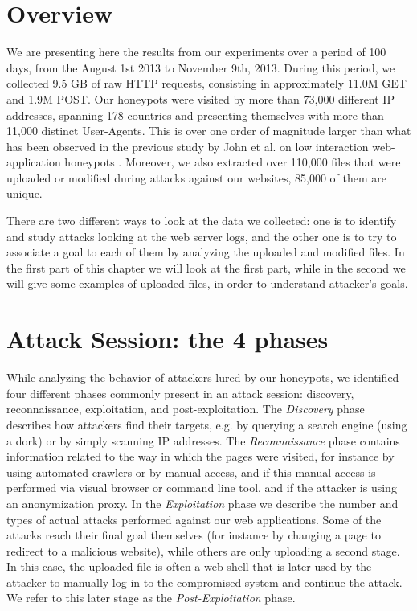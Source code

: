 \section{Overview}

We are presenting here the results from our experiments over a period of 100 days, from the August 1st 2013 to November 9th, 2013. During this period, we collected 9.5 GB of raw HTTP requests, consisting in approximately 11.0M GET and 1.9M POST. Our honeypots were visited by more than 73,000 different IP addresses, spanning 178 countries and presenting themselves with more than 11,000 distinct User-Agents. This is over one order of magnitude larger than what has been observed in the previous study by John et al. on low interaction web-application honeypots \cite{johnhsh}. Moreover, we also extracted over 110,000 files that were uploaded or modified during attacks against our websites, 85,000 of them are unique.

There are two different ways to look at the data we collected: one is to identify and study attacks looking at the web server logs, and the other one is to try to associate a goal to each of them by analyzing the uploaded and modified files. In the first part of this chapter we will look at the first part, while in the second we will give some examples of uploaded files, in order to understand attacker's goals.

\section{Attack Session: the 4 phases}

While analyzing the behavior of attackers lured by our honeypots, we identified four different phases commonly present in an attack session: discovery, reconnaissance, exploitation, and post-exploitation. The \emph{Discovery} phase describes how attackers find their targets, e.g. by querying a search engine (using a dork) or by simply scanning IP addresses. The \emph{Reconnaissance} phase contains information related to the way in which the pages were visited, for instance by using automated crawlers or by manual access, and if this manual access is performed via visual browser or command line tool, and if the attacker is using an anonymization proxy. In the \emph{Exploitation} phase we describe the number and types of actual attacks performed against our web applications. Some of the attacks reach their final goal themselves (for instance by changing a page to redirect to a malicious website), while others are only uploading a second stage. In this case, the uploaded file is often a web shell that is later used by the attacker to manually log in to the compromised system and continue the attack. We refer to this later stage as the \emph{Post-Exploitation} phase.

